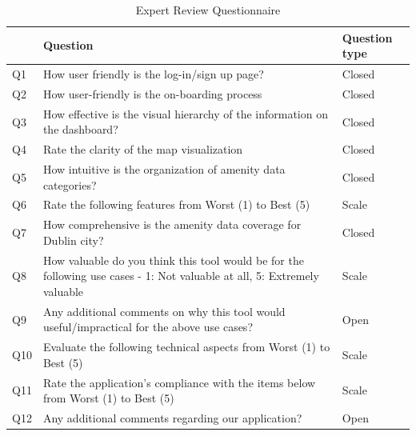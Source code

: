 \begin{table}[h!]
    \centering
    \caption{Expert Review Questionnaire}
    \begin{tabular}{|p{}|p{}|p{}|}
        \hline
            & \textbf{Question}                                                                                                        & \textbf{Question type} \\
        \hline
        Q1  & How user friendly is the log-in/sign up page?                                                                            & Closed                 \\
        \hline
        Q2  & How user-friendly is the on-boarding process                                                                             & Closed                 \\
        \hline
        Q3  & How effective is the visual hierarchy of the information on the dashboard?                                               & Closed                 \\
        \hline
        Q4  & Rate the clarity of the map visualization                                                                                & Closed                 \\
        \hline
        Q5  & How intuitive is the organization of amenity data categories?                                                            & Closed                 \\
        \hline
        Q6  & Rate the following features from Worst (1) to Best (5)                                                                   & Scale                  \\
        \hline
        Q7  & How comprehensive is the amenity data coverage for Dublin city?                                                          & Closed                 \\
        \hline
        Q8  & How valuable do you think this tool would be for the following use cases - 1: Not valuable at all, 5: Extremely valuable & Scale                  \\
        \hline
        Q9  & Any additional comments on why this tool would useful/impractical for the above use cases?                               & Open                   \\
        \hline
        Q10 & Evaluate the following technical aspects from Worst (1) to Best (5)                                                      & Scale                  \\
        \hline
        Q11 & Rate the application's compliance with the items below from Worst (1) to Best (5)                                        & Scale                  \\
        \hline
        Q12 & Any additional comments regarding our application?                                                                       & Open                   \\
        \hline
    \end{tabular}
\end{table}

